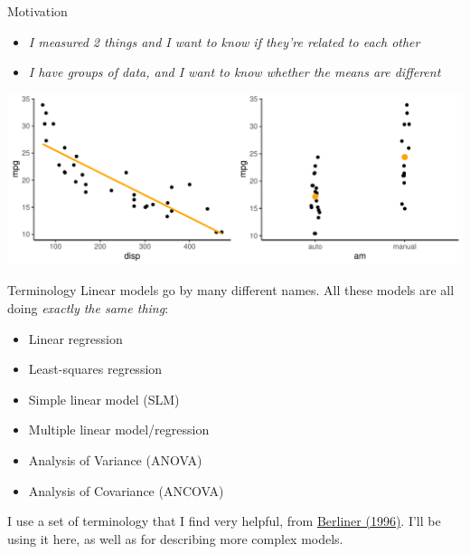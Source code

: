 \documentclass[
  ignorenonframetext,
  aspectratio=169]{beamer}
\providecommand{\tightlist}{%
  \setlength{\itemsep}{0pt}\setlength{\parskip}{0pt}}
\begin{document}
\begin{frame}{Motivation}
\protect\hypertarget{motivation}{}
\begin{itemize}
\tightlist
\item
  \emph{I measured 2 things and I want to know if they're related to
  each other}
\end{itemize}

\begin{itemize}
\tightlist
\item
  \emph{I have groups of data, and I want to know whether the means are
  different}
\end{itemize}

\includegraphics{03-Lecture_files/figure-beamer/examplePlots-1.pdf}
\end{frame}

\begin{frame}{Terminology}
\protect\hypertarget{terminology}{}
Linear models go by many different names. All these models are all doing
\emph{exactly the same thing}:

\begin{itemize}[<+->]
\item
  Linear regression
\item
  Least-squares regression
\item
  Simple linear model (SLM)
\item
  Multiple linear model/regression
\item
  Analysis of Variance (ANOVA)
\item
  Analysis of Covariance (ANCOVA)
\end{itemize}

\pause

I use a set of terminology that I find very helpful, from
\href{https://link.springer.com/chapter/10.1007/978-94-011-5430-7_3}{Berliner
(1996)}. I'll be using it here, as well as for describing more complex
models.
\end{frame}
\end{document}
